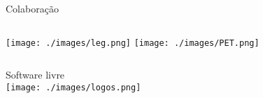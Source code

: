 \begin{frame}
  \frametitle{}
  \framesubtitle{}

  \begin{center}
    Colaboração
  \end{center}
  \begin{columns}[t]
    \hfill\texttt{[image: ./images/leg.png]}
    \hfill
    \texttt{[image: ./images/PET.png]}\hfill
  \end{columns}
  
\begin{center}
  Software livre\\ \vspace{1em}
  \texttt{[image: ./images/logos.png]}
\end{center}

\end{frame}
